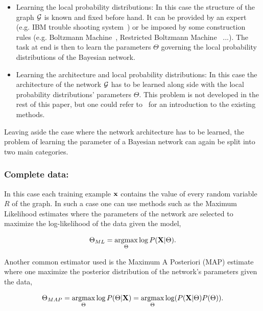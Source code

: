 \documentclass[a4paper,11pt]{report}
\begin{document}
      \begin{itemize}
				\item Learning the local probability distributions: In this case the structure of the graph $\mathcal{G}$ is known and fixed before hand. It can be provided by an expert (e.g. IBM trouble shooting system~\citep{rish2002efficient}) or be imposed by some construction rules (e.g. Boltzmann Machine~\citep{ackley1985learning}, Restricted Boltzmann Machine~\citep{smolensky1986information} ...). The task at end is then to learn the parameters $\Theta$ governing the local probability distributions of the Bayesian network.\\
				
        \item Learning the architecture and local probability distributions: In this case the architecture of the network $\mathcal{G}$ has to be learned along side with the local probability distributions' parameters $\Theta$. This problem is not developed in the rest of this paper, but one could refer to~\citep{margaritis2003learning} for an introduction to the existing methods.\\
      \end{itemize}
      
      Leaving aside the case where the network architecture has to be learned, the problem of learning the parameter of a Bayesian network can again be split into two main categories. 
      
      \subsubsection{Complete data:}

				In this case each training example ${\bf x}$ contains the value of every random variable $R$ of the graph. In such a case one can use methods such as the Maximum Likelihood estimates where the parameters of the network are selected to maximize the log-likelihood of the data given the model,
				
      \begin{equation}
        \Theta_{ML} = \mathop{\rm argmax}_{\Theta} \log P({\bf X} | \Theta).
        \label{eq:BN ML}
      \end{equation}
      
      Another common estimator used is the Maximum A Posteriori (MAP) estimate where one maximize the posterior distribution of the network's parameters given the data,
      
      \begin{equation}
        \Theta_{MAP} = \mathop{\rm argmax}_{\Theta} \log P(\Theta | {\bf X}) = \mathop{\rm argmax}_{\Theta} \log (P({\bf X} | \Theta)P(\Theta)). 
        \label{eq:BN MAP}
      \end{equation}    
           
\end{document}
